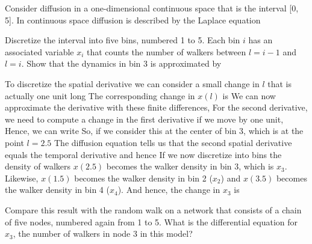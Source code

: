 Consider diffusion in a one-dimensional continuous space that is the interval [0, 5]. In continuous space diffusion is described by the Laplace equation

\subquestion 
Discretize the interval into five bins, numbered 1 to 5. Each bin $i$ has an associated variable $x_i$ that counts the number of walkers between $l=i-1$ and $l=i$. Show that the dynamics in bin 3 is approximated by

\solution 
To discretize the spatial derivative we can consider a small change in $l$ that is actually one unit long 
The corresponding change in $x(l)$ is 
We can now approximate the derivative with these finite differences, 
For the second derivative, we need to compute a change in the first derivative if we move by one unit,  
Hence, we can write 
So, if we consider this at the center of bin 3, which is at the point $l=2.5$
The diffusion equation tells us that the second spatial derivative equals the temporal derivative and hence 
If we now discretize into bins the density of walkers $x(2.5)$ becomes the walker density in bin 3, which is $x_3$. Likewise, $x(1.5)$ becomes the walker density in bin 2 ($x_2$) and $x(3.5)$ becomes the walker density in bin 4 ($x_4$). And hence, the change in $x_3$ is 

\subquestion 
Compare this result with the random walk on a network that consists of a chain of five nodes, numbered again from 1 to 5. What is the differential equation for $x_3$, the number of walkers in node 3 in this model?

